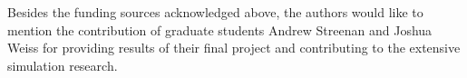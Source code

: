 \documentclass{ifacconf}
\begin{document}
\begin{ack}                               %

Besides the funding sources acknowledged above, the authors would like to mention the
contribution of graduate students Andrew Streenan and Joshua Weiss for providing results
of their final project and contributing to the extensive simulation research.
\end{ack}



\end{document}
